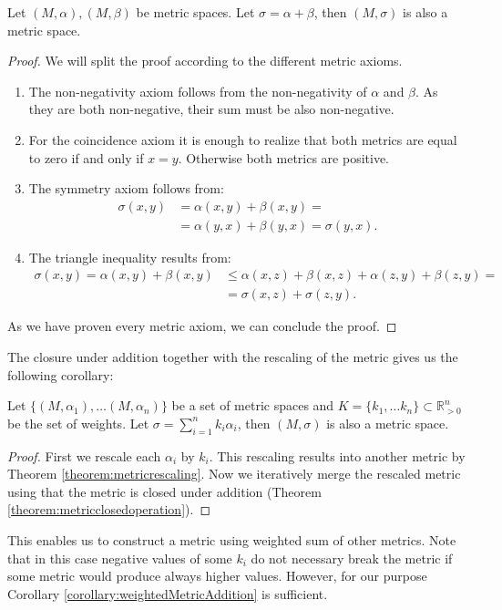 	\begin{theorem}
		\label{theorem:metricclosedoperation}
		Let $(M,\alpha),(M,\beta)$ be metric spaces. Let $\sigma=\alpha+\beta$, then $(M,\sigma)$ is also a metric space.
		
		\begin{proof}
		We will split the proof according to the different metric axioms.
			\begin{enumerate}
				\item The non-negativity axiom follows from the non-negativity of $\alpha$ and $\beta$. As they are both non-negative, their sum must be also non-negative.
				\item For the coincidence axiom it is enough to realize that both metrics are equal to zero if and only if $x=y$. Otherwise both metrics are positive.
				\item The symmetry axiom follows from:
				\begin{align*}
				\sigma(x,y)&=\alpha(x,y)+\beta(x,y)=\\
				&=\alpha(y,x)+\beta(y,x)=\sigma(y,x).
				\end{align*} 
				\item The triangle inequality results from:
				\begin{align*}
				\sigma(x,y)=\alpha(x,y)+\beta(x,y) & \le \alpha(x,z)+\beta(x,z) + \alpha(z,y)+\beta(z,y) = \\
				& = \sigma(x,z)+\sigma(z,y).
				\end{align*} 
			\end{enumerate}
			As we have proven every metric axiom, we can conclude the proof.
		\end{proof}
	\end{theorem}
	
	The closure under addition together with the rescaling of the metric gives us the following corollary: 
	
	\begin{corollary}
		\label{corollary:weightedMetricAddition}
		Let $\lbrace (M,\alpha_1), \dots (M,\alpha_n) \rbrace$ be a set of metric spaces and $K=\lbrace k_1, \dots k_n \rbrace \subset \mathbb{R}_{>0}^n$ be the set of weights. Let $\sigma=\sum_{i=1}^{n}k_i\alpha_i$, then $(M,\sigma)$ is also a metric space.
		
		\begin{proof}
			First we rescale each $\alpha_i$ by $k_i$. This rescaling results into another metric by Theorem \ref{theorem:metricrescaling}. Now we iteratively merge the rescaled metric using that the metric is closed under addition (Theorem \ref{theorem:metricclosedoperation}).
		\end{proof}
	\end{corollary}
	This enables us to construct a metric using weighted sum of other metrics. Note that in this case negative values of some $k_i$ do not necessary break the metric if some metric would produce always higher values. However, for our purpose Corollary \ref{corollary:weightedMetricAddition} is sufficient.

